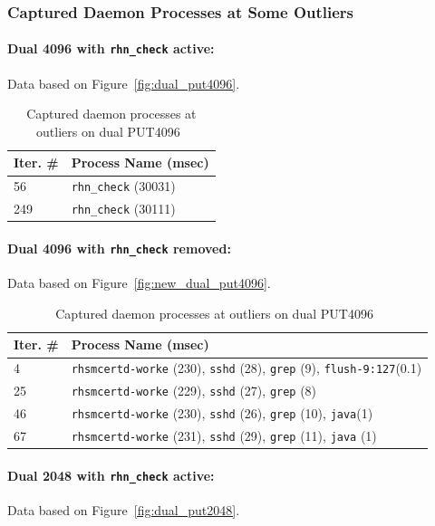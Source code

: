 \documentclass[10pt]{article}
\begin{document}
\clearpage
\newpage

\subsubsection{Captured Daemon Processes at Some Outliers}

\paragraph{Dual 4096 with {\tt rhn\_check} active:} Data based on Figure~\ref{fig:dual_put4096}.

\begin{table}[htp!]
\centering
{
 \begin{tabular}{|p{2cm}|p{8cm}|} \hline
Iter. \# & Process Name (msec)\\ \hline
56 & {\tt rhn\_check} (30031) \\ \hline
249 & {\tt rhn\_check} (30111) \\ \hline
  \end{tabular}
  }
 \caption{Captured daemon processes at outliers on dual PUT4096~\label{fig:dual_put4096_procs}}
\end{table}

\paragraph{Dual 4096 with {\tt rhn\_check} removed:} Data based on Figure~\ref{fig:new_dual_put4096}.

\begin{table}[htp!]
\centering
{
 \begin{tabular}{|p{2cm}|p{8cm}|} \hline
Iter. \# & Process Name (msec)\\ \hline
4 & {\tt rhsmcertd-worke} (230), {\tt sshd} (28), {\tt grep} (9), {\tt flush-9:127}(0.1)\\ \hline
25 & {\tt rhsmcertd-worke} (229), {\tt sshd} (27), {\tt grep} (8)\\ \hline
46 & {\tt rhsmcertd-worke} (230), {\tt sshd} (26), {\tt grep} (10), {\tt java}(1) \\ \hline
67 & {\tt rhsmcertd-worke} (231), {\tt sshd} (29), {\tt grep} (11),  {\tt java} (1) \\ \hline
  \end{tabular}
  }
 \caption{Captured daemon processes at outliers on dual PUT4096~\label{fig:no_rhn_dual_put4096_procs}}
\end{table}

\paragraph{Dual 2048 with {\tt rhn\_check} active:} Data based on Figure~\ref{fig:dual_put2048}.
\end{document}

